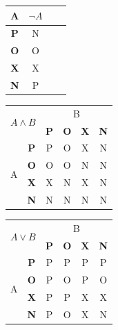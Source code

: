 \documentclass[a4paper, 11pt]{article}
\begin{document}
  \begin{table}[h]
    \centering
    \begin{tabular}[p]{|c|c|cl}
        \hline
        A               & $\neg{A}$  \\ \hline
        \textbf{P}      & N       \\ \hline
        \textbf{O}      & O       \\ \hline
        \textbf{X}      & X       \\ \hline
        \textbf{N}      & P       \\ \hline
    \end{tabular}
    \begin{tabular}[p]{|c|c|c|c|c|c|}
        \hline
        \multicolumn{2}{|l|}{\multirow{2}{*}{$A \wedge B$ }} & \multicolumn{4}{c|}{B} \\
        \cline{3-6}
        \multicolumn{2}{|l|}{}  & \textbf{P} & \textbf{O} & \textbf{X} & \textbf{N}\\
        \cline{1-2}\cline{3-6}
        \multirow{4}{*}{A} & \textbf{P} & P          & O          & X          & N \\
        \cline{2-6}
                           & \textbf{O} & O          & O          & N          & N \\
        \cline{2-6}
                           & \textbf{X} & X          & N          & X          & N \\
        \cline{2-6}
                           & \textbf{N} & N          & N          & N          & N \\
        \hline
    \end{tabular}
    \begin{tabular}[p]{|c|c|c|c|c|c|}
        \hline
        \multicolumn{2}{|l|}{\multirow{2}{*}{$A \vee B$ }} & \multicolumn{4}{c|}{B}\\
        \cline{3-6}
        \multicolumn{2}{|l|}{}  & \textbf{P} & \textbf{O} & \textbf{X} & \textbf{N}\\
        \hline
        \multirow{4}{*}{A} & \textbf{P} & P          & P          & P          & P \\
        \cline{2-6}
                           & \textbf{O} & P          & O          & P          & O \\
        \cline{2-6}
                           & \textbf{X} & P          & P          & X          & X \\
        \cline{2-6}
                           & \textbf{N} & P          & O          & X          & N \\

\end{tabular}
\end{table}
\end{document}
